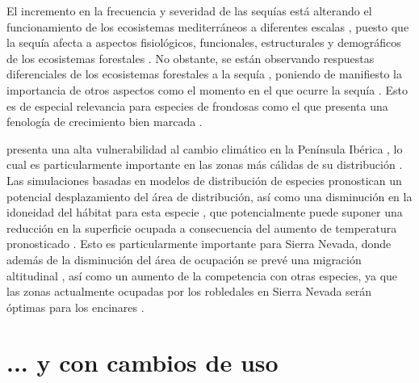 El incremento en la frecuencia y severidad de las sequías está alterando el funcionamiento de los ecosistemas mediterráneos a diferentes escalas \autocites{Penuelasetal2017ImpactsGlobal,Forneretal2018ExtremeDroughts,Liuetal2020EffectsDecadal,OgayaPenuelas2021ClimateChange}, puesto que la sequía afecta a aspectos fisiológicos, funcionales, estructurales y demográficos de los ecosistemas forestales \autocites{Allenetal2010GlobalOverview, Assaletal2016SpatialTemporal}. No obstante, se están observando respuestas diferenciales de los ecosistemas forestales a la sequía \autocites{Andereggetal2020DivergentForest}, poniendo de manifiesto la importancia de otros aspectos como el momento en el que ocurre la sequía \autocites{Huangetal2018DroughtTiming}. Esto es de especial relevancia para especies de frondosas como el \Qpy que presenta una fenología de crecimiento bien marcada \autocites{PerezdeLisetal2016ChangesSpring}. 

\Qp presenta una alta vulnerabilidad al cambio climático en la Península Ibérica \autocites{GarciaValdesetal2013ChasingMoving,BenitoGarzonetal2008EffectsClimate,Benitoetal2011SimulatingPotential}, lo cual es particularmente importante en las zonas más cálidas de su distribución \autocites{GeaIzquierdoCanellas2014LocalClimate}. Las simulaciones basadas en modelos de distribución de especies pronostican un potencial desplazamiento del área de distribución, así como una disminución en la idoneidad del hábitat para esta especie \autocites{Mateoetal2010EffectsNumber,BenitoGarzonetal2008EffectsClimate,Felicisimo2011ImpactosVulnerabilidad,Felicisimoetal2012VulnerabilidadFlora,RuizLabourdetteetal2011ForestComposition,Urbietaetal2011MediterraneanPine,Benitoetal2011SimulatingPotential}, que potencialmente puede suponer una reducción en la superficie ocupada a consecuencia del aumento de temperatura pronosticado \autocites{BenitoGarzonetal2008EffectsClimate,Benitoetal2011SimulatingPotential}. Esto es particularmente importante para Sierra Nevada, donde además de la disminución del área de ocupación se prevé una migración altitudinal \autocites{Benitoetal2011SimulatingPotential,Benito2009EcoinformaticaAplicada}, así como un aumento de la competencia con otras especies, ya que las zonas actualmente ocupadas por los robledales en Sierra Nevada serán óptimas para los encinares \autocites{Benitoetal2011SimulatingPotential}.

\section{... y con cambios de uso}\label{sec:intro:land-use}

